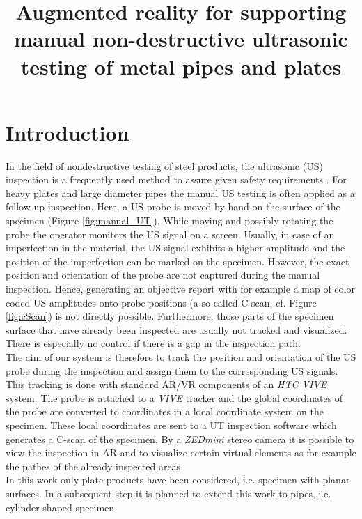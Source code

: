 \documentclass{VRARWorkshop}
\title{Augmented reality for supporting manual non-destructive ultrasonic testing of metal pipes and plates}
\begin{document}
\section{Introduction}

In the field of nondestructive testing of steel products, the ultrasonic (US) inspection is a frequently used method to assure given safety requirements \cite{deutsch_zfp_2010} \cite{moles_introduction_2004}
\cite{olympus_Grundlagen}.
For heavy plates and large diameter pipes the manual US testing is often applied as a follow-up inspection. Here, a US probe is moved by hand on the surface of the specimen (Figure \ref{fig:manual_UT}). While moving and possibly rotating the probe the operator monitors the US signal on a screen. Usually, in case of an imperfection in the material, the US signal exhibits a higher amplitude and the position of the imperfection can be marked on the specimen.
However, the exact position and orientation of the probe are not captured during the manual inspection. Hence, generating an objective report with for example a map of color coded US amplitudes onto probe positions (a so-called C-scan, cf. Figure \ref{fig:cScan}) is not directly possible.
Furthermore, those parts of the specimen surface that have already been inspected are usually not tracked and visualized.
There is especially no control if there is a gap in the inspection path. \\
The aim of our system is therefore to track the position and orientation of the US probe during the inspection and assign them to the corresponding US signals. This tracking is done with standard AR/VR components of an \textit{HTC VIVE} system. The probe is attached to a \textit{VIVE} tracker and the global coordinates of the probe are converted to coordinates in a local coordinate system on the specimen. These local coordinates are sent to a UT inspection software which generates a C-scan of the specimen. 
By a \textit{ZEDmini} stereo camera it is possible to view the inspection in AR and to visualize certain virtual elements as for example the pathes of the already inspected areas. \\
In this work only plate products have been considered, i.e. specimen with planar surfaces. In a subsequent step it is planned to extend this work to pipes, i.e. cylinder shaped specimen.
\end{document}
